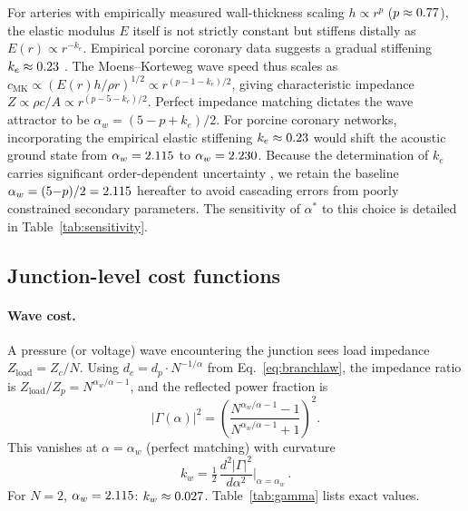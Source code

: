 \documentclass[11pt,a4paper]{article}
\theoremstyle{remark}
\begin{document}
For arteries with empirically measured wall-thickness scaling $h \propto r^p$
($p \approx 0.77$), the elastic modulus $E$ itself is not strictly constant but
stiffens distally as $E(r) \propto r^{-k_e}$. Empirical porcine coronary data
suggests a gradual stiffening $k_e \approx 0.23$
\cite{Kassab1993,Nichols2011}. The Moens--Korteweg wave speed thus scales as
$c_\mathrm{MK} \propto (E(r)h/\rho r)^{1/2} \propto r^{(p-1-k_e)/2}$, giving
characteristic impedance $Z \propto \rho c/A \propto r^{(p-5-k_e)/2}$. Perfect
impedance matching dictates the wave attractor to be $\alpha_w = (5-p+k_e)/2$.
For porcine coronary networks, incorporating the empirical elastic stiffening
$k_e \approx 0.23$ would shift the acoustic ground state from $\alpha_w =
2.115$ to $\alpha_w = 2.230$. Because the determination of $k_e$
carries significant order-dependent uncertainty \cite{Kassab1993,Nichols2011},
we retain the baseline $\alpha_w = (5{-}p)/2 = 2.115$ hereafter to avoid
cascading errors from poorly constrained secondary parameters. The sensitivity
of $\alpha^*$ to this choice is detailed in Table~\ref{tab:sensitivity}.

\subsection{Junction-level cost functions}
\label{sec:junction}

\paragraph{Wave cost.}
A pressure (or voltage) wave encountering the junction sees load impedance
$Z_\mathrm{load} = Z_c/N$.
Using $d_c = d_p \cdot N^{-1/\alpha}$ from Eq.~\eqref{eq:branchlaw}, the
impedance ratio is $Z_\mathrm{load}/Z_p = N^{\alpha_w/\alpha - 1}$, and the
reflected power fraction is \cite{Pozar2012}
\begin{equation}
  |\Gamma(\alpha)|^2 = \left(\frac{N^{\alpha_w/\alpha - 1} - 1}{N^{\alpha_w/\alpha - 1} + 1}\right)^{\!2}.
  \label{eq:gamma_gen}
\end{equation}
This vanishes at $\alpha = \alpha_w$ (perfect matching) with curvature
\begin{equation}
  k_w = \tfrac{1}{2}\,\frac{d^2|\Gamma|^2}{d\alpha^2}\bigg|_{\alpha=\alpha_w}\,.
  \label{eq:kw}
\end{equation}
For $N = 2$, $\alpha_w = 2.115$: $k_w \approx 0.027$.
Table~\ref{tab:gamma} lists exact values.
\end{document}
